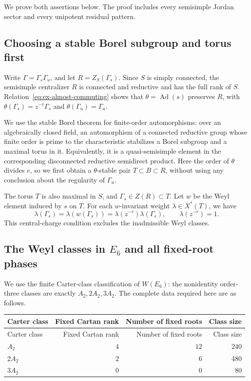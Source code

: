 \documentclass[11pt,a4paper]{article}
\theoremstyle{definition}
\theoremstyle{remark}
\begin{document}
We prove both assertions below. The proof includes every semisimple
Jordan sector and every unipotent residual pattern.

\subsection{Choosing a stable Borel subgroup and torus first}
\label{subsec:ex-stable-borel}

Write \(\Gamma=\Gamma_s\Gamma_u\), and let
\(R=Z_S(\Gamma_s)\). Since \(S\) is simply connected, the semisimple
centralizer \(R\) is connected and reductive and has the full rank of \(S\).
Relation~\eqref{eq:ex-almost-commuting} shows that
\(\theta=\operatorname{Ad}(s)\) preserves \(R\), with
\(\theta(\Gamma_s)=z^{-r}\Gamma_s\) and
\(\theta(\Gamma_u)=\Gamma_u\).

We use the stable Borel theorem for finite-order automorphisms: over an
algebraically closed field, an automorphism of a connected reductive group
whose finite order is prime to the characteristic stabilizes a Borel
subgroup and a maximal torus in it. Equivalently, it is a quasi-semisimple
element in the corresponding disconnected reductive semidirect product.
Here the order of \(\theta\) divides \(e\), so we first obtain a
\(\theta\)-stable pair \(T\subset B\subset R\), without using any conclusion
about the regularity of \(\Gamma_u\).

The torus \(T\) is also maximal in \(S\), and
\(\Gamma_s\in Z(R)\subset T\).
Let \(w\) be the Weyl element induced by \(s\) on \(T\).
For each \(w\)-invariant weight \(\lambda\in X^*(T)\), we have
\begin{equation}\label{eq:ex-central-charge}
\lambda(\Gamma_s)=\lambda(w(\Gamma_s))
 =\lambda(z^{-r})\lambda(\Gamma_s),
\qquad \lambda(z^{-r})=1.
\end{equation}
This central-charge condition excludes the inadmissible Weyl classes.

\subsection{The Weyl classes in \(E_6\) and all fixed-root phases}
\label{subsec:ex-e6-weyl}

We use the finite Carter-class classification of \(W(E_6)\):
the nonidentity order-three classes are exactly \(A_2,2A_2,3A_2\).
The complete data required here are as follows.

\begin{longtable}{@{}lrrr@{}}
\toprule
Carter class & Fixed Cartan rank & Number of fixed roots & Class size\\
\midrule
\endfirsthead
\toprule
Carter class & Fixed Cartan rank & Number of fixed roots & Class size\\
\midrule
\endhead
\(A_2\) & \(4\) & \(12\) & \(240\)\\
\(2A_2\) & \(2\) & \(6\) & \(480\)\\
\(3A_2\) & \(0\) & \(0\) & \(80\)\\
\bottomrule
\end{longtable}
\end{document}
